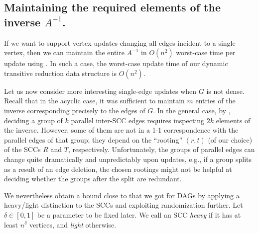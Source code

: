 \documentclass[11pt]{article}
\begin{document}
{\subsection{Maintaining the required elements of the inverse $A^{-1}$.}
If we want to support vertex updates changing all edges incident to a single vertex, then we can maintain the entire $A^{-1}$
in $O(n^2)$ worst-case time per update
using . In such a case, the worst-case update time of our dynamic transitive reduction data structure is $O(n^2)$.

Let us now consider more interesting single-edge updates when $G$ is not dense.
Recall that in the acyclic case, it was sufficient
to maintain $m$ entries of the inverse corresponding precisely to the edges of $G$.
In the general case, by ,
deciding a group of $k$ parallel
inter-SCC edges requires inspecting $2k$
elements of the inverse.
However, some of them are not in a 1-1 correspondence with the parallel edges of that group; they depend
on the ``rooting'' $(r,t)$ (of our choice) of the SCCs $R$ and $T$, respectively.
Unfortunately, the groups of parallel edges can change quite dramatically and unpredictably upon updates, e.g., if a group splits as a result of an edge deletion,
the chosen rootings might not be helpful at deciding whether the groups after the split are redundant.

We nevertheless obtain a bound close to that we got for DAGs by applying a heavy/light distinction to the SCCs and exploiting randomization further.
Let $\delta\in [0,1]$ be a parameter to be fixed later.
We call an SCC \emph{heavy} if it has at least $n^\delta$ vertices,
and \emph{light} otherwise.

}
\end{document}

